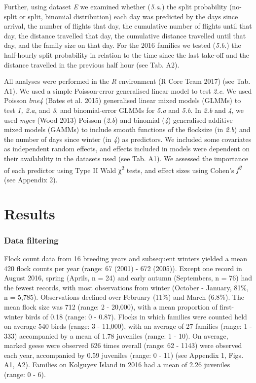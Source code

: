 \documentclass[10pt,twocolumn]{paper}
\begin{document}
Further, using dataset \emph{E} we examined whether (\emph{5.a.}) the
split probability (no-split or split, binomial distribution) each day
was predicted by the days since arrival, the number of flights that day,
the cumulative number of flights until that day, the distance travelled
that day, the cumulative distance travelled until that day, and the
family size on that day. For the 2016 families we tested (\emph{5.b.})
the half-hourly split probability in relation to the time since the last
take-off and the distance travelled in the previous half hour (see Tab.
A2).

All analyses were performed in the \emph{R} environment (R Core Team
2017) (see Tab. A1). We used a simple Poisson-error generalised linear
model to test \emph{2.c}. We used Poisson \emph{lme4} (Bates et al.
2015) generalised linear mixed models (GLMMs) to test \emph{1, 2.a}, and
\emph{3}, and binomial-error GLMMs for \emph{5.a} and \emph{5.b}. In
\emph{2.b} and \emph{4}, we used \emph{mgcv} (Wood 2013) Poisson
(\emph{2.b}) and binomial (\emph{4}) generalised additive mixed models
(GAMMs) to include smooth functions of the flocksize (in \emph{2.b}) and
the number of days since winter (in \emph{4}) as predictors. We included
some covariates as independent random effects, and effects included in
models were dependent on their availability in the datasets used (see
Tab. A1). We assessed the importance of each predictor using Type II
Wald χ\textsuperscript{2} tests, and effect sizes using Cohen's
\emph{f\textsuperscript{2}} (see Appendix 2).

\section{Results}\label{results}

\subsubsection{Data filtering}\label{data-filtering}

Flock count data from 16 breeding years and subsequent winters yielded a
mean 420 flock counts per year (range: 67 (2001) - 672 (2005)). Except
one record in August 2016, spring (Aprils, n = 24) and early autumn
(Septembers, n = 76) had the fewest records, with most observations from
winter (October - January, 81\%, n = 5,785). Observations declined over
February (11\%) and March (6.8\%). The mean flock size was 712 (range: 2
- 20,000), with a mean proportion of first-winter birds of 0.18 (range:
0 - 0.87). Flocks in which families were counted held on average 540
birds (range: 3 - 11,000), with an average of 27 families (range: 1 -
333) accompanied by a mean of 1.78 juveniles (range: 1 - 10). On
average, marked geese were observed 626 times overall (range: 62 - 1143)
were observed each year, accompanied by 0.59 juveniles (range: 0 - 11)
(see Appendix 1, Figs. A1, A2). Families on Kolguyev Island in 2016 had
a mean of 2.26 juveniles (range: 0 - 6).
\end{document}
